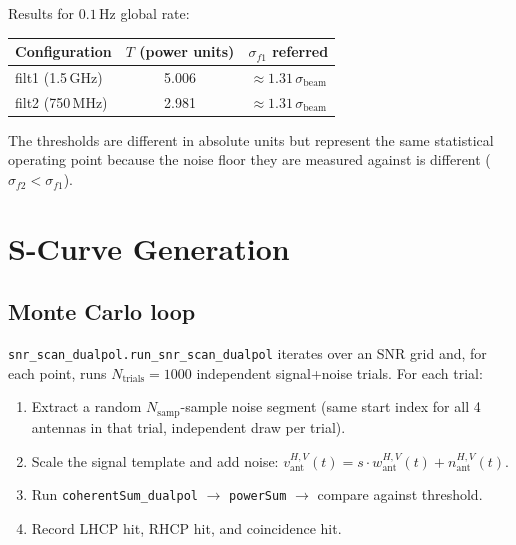 \documentclass[11pt,letterpaper]{article}
\begin{document}
Results for $0.1$\,Hz global rate:

\begin{center}
\begin{tabular}{lcc}
\toprule
Configuration & $T$ (power units) & $\sigma_{f1}$ referred \\
\midrule
filt1 (1.5\,GHz) & 5.006 & $\approx 1.31\,\sigma_\mathrm{beam}$ \\
filt2 (750\,MHz) & 2.981 & $\approx 1.31\,\sigma_\mathrm{beam}$ \\
\bottomrule
\end{tabular}
\end{center}

The thresholds are different in absolute units but represent the same
statistical operating point because the noise floor they are measured against
is different ($\sigma_{f2} < \sigma_{f1}$).

\section{S-Curve Generation}

\subsection{Monte Carlo loop}

\texttt{snr\_scan\_dualpol.run\_snr\_scan\_dualpol} iterates over an SNR grid
and, for each point, runs $N_\mathrm{trials} = 1000$ independent signal+noise
trials. For each trial:

\begin{enumerate}
  \item Extract a random $N_\mathrm{samp}$-sample noise segment (same start
        index for all 4 antennas in that trial, independent draw per trial).
  \item Scale the signal template and add noise:
        $v_\mathrm{ant}^{H,V}(t) = s \cdot w_\mathrm{ant}^{H,V}(t) + n_\mathrm{ant}^{H,V}(t)$.
  \item Run \texttt{coherentSum\_dualpol} $\to$ \texttt{powerSum} $\to$
        compare against threshold.
  \item Record LHCP hit, RHCP hit, and coincidence hit.
\end{enumerate}
\end{document}
